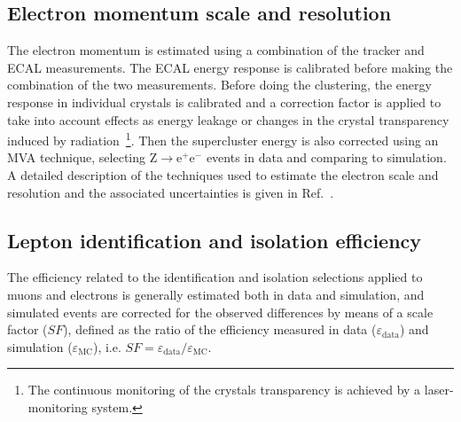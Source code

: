 \subsection{Electron momentum scale and resolution}
The electron momentum is estimated using a combination of the tracker and ECAL measurements. The ECAL energy response is calibrated before making the combination of the two measurements. Before doing the clustering, the energy response in individual crystals is calibrated and a correction factor is applied to take into account effects as energy leakage or changes in the crystal transparency induced by radiation~\footnote{The continuous monitoring of the crystals transparency is achieved by a laser-monitoring system.}. Then the supercluster energy is also corrected using an MVA technique, selecting $\mathrm{Z\to e^+ e^-}$ events in data and comparing to simulation. A detailed description of the techniques used to estimate the electron scale and resolution and the associated uncertainties is given in Ref.~\cite{Khachatryan:2015hwa}.



\subsection{Lepton identification and isolation efficiency}\label{sec:lepIdIsoEff}
The efficiency related to the identification and isolation selections applied to muons and electrons is generally estimated both in data and simulation, and simulated events are corrected for the observed differences by means of a scale factor ($SF$), defined as the ratio of the efficiency measured in data ($\varepsilon_\mathrm{data}$) and simulation ($\varepsilon_\mathrm{MC}$), i.e. $SF = \varepsilon_\mathrm{data}/\varepsilon_\mathrm{MC}$.

